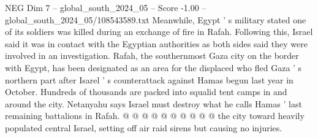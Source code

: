 \begin{textsample}{NEG Dim 7 – global\_south\_2024\_05 – Score -1.00 – global\_south\_2024\_05/108543589.txt}
Meanwhile, Egypt ' s military stated one of its soldiers was killed during an exchange of fire in Rafah.
Following this, Israel said it was in contact with the Egyptian authorities as both sides said they were involved in an investigation.
Rafah, the southernmost Gaza city on the border with Egypt, has been designated as an area for the displaced who fled Gaza ' s northern part after Isarel ' s counterattack against Hamas begun last year in October.
Hundreds of thousands are packed into squalid tent camps in and around the city.
Netanyahu says Israel must destroy what he calls Hamas ' last remaining battalions in Rafah. @ @ @ @ @ @ @ @ @ @ the city toward heavily populated central Israel, setting off air raid sirens but causing no injuries.

\end{textsample}
